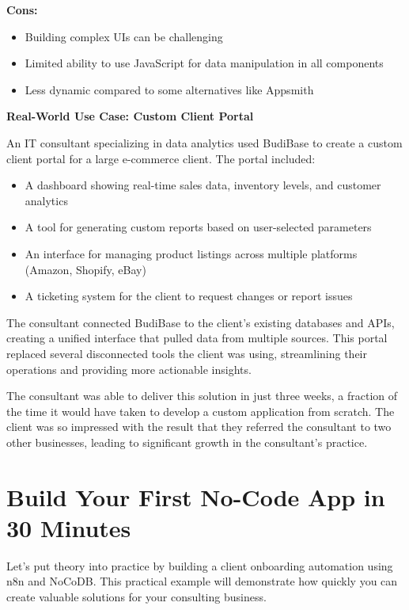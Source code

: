 \textbf{Cons:}
\begin{itemize}
    \item Building complex UIs can be challenging
    \item Limited ability to use JavaScript for data manipulation in all components
    \item Less dynamic compared to some alternatives like Appsmith
\end{itemize}

\textbf{Real-World Use Case: Custom Client Portal}

An IT consultant specializing in data analytics used BudiBase to create a custom client portal for a large e-commerce client. The portal included:

\begin{itemize}
    \item A dashboard showing real-time sales data, inventory levels, and customer analytics
    \item A tool for generating custom reports based on user-selected parameters
    \item An interface for managing product listings across multiple platforms (Amazon, Shopify, eBay)
    \item A ticketing system for the client to request changes or report issues
\end{itemize}

The consultant connected BudiBase to the client's existing databases and APIs, creating a unified interface that pulled data from multiple sources. This portal replaced several disconnected tools the client was using, streamlining their operations and providing more actionable insights.

The consultant was able to deliver this solution in just three weeks, a fraction of the time it would have taken to develop a custom application from scratch. The client was so impressed with the result that they referred the consultant to two other businesses, leading to significant growth in the consultant's practice.

\section{Build Your First No-Code App in 30 Minutes}

Let's put theory into practice by building a client onboarding automation using n8n and NoCoDB. This practical example will demonstrate how quickly you can create valuable solutions for your consulting business.

